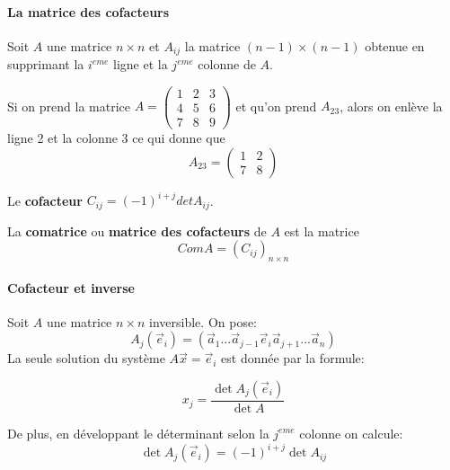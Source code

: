 




\paragraph{La matrice des cofacteurs} Soit $A$ une matrice $n \times n$ et $A_{ij}$ la matrice $(n-1) \times (n-1)$ obtenue en supprimant la $i^{eme}$ ligne et la $j^{eme}$ colonne de $A$.
\\
\begin{exemple}
    Si on prend la matrice $A = \begin{pmatrix}
        1 & 2 & 3 \\
        4 & 5 & 6 \\
        7 & 8 & 9
    \end{pmatrix}$ et qu'on prend $A_{23}$, alors on enlève la ligne 2 et la colonne 3 ce qui donne que 
    \[ A_{23} = \begin{pmatrix}
        1 & 2 \\
        7 & 8
    \end{pmatrix}\]
    \begin{definition}
        Le \textbf{cofacteur} $C_{ij} = (-1)^{i+j}det A_{ij}$.
    \end{definition}
\end{exemple}
\begin{definition}
    
    La \textbf{comatrice} ou \textbf{matrice des cofacteurs} de $A$ est la matrice
    \[ComA = (C_{ij})_{n\times n}\]
\end{definition}

\paragraph{Cofacteur et inverse}
Soit $A$ une matrice $n \times n$ inversible. On pose:
\[A_j(\vec{e}_i) = (\vec{a}_1 ... \vec{a}_{j-1} \vec{e}_i \vec{a}_{j+1} ... \vec{a}_n)\]
La seule solution du système $A\vec{x} = \vec{e}_i$ est donnée par la formule:
\begin{definition}
    \begin{equation*}
        x_j = \frac{\det A_j(\vec{e}_i)}{\det A}
    \end{equation*}
\end{definition}


De plus, en développant le déterminant selon la $j^{eme}$ colonne on calcule:
\[\det A_j(\vec{e}_i) = (-1)^{i+j}\det A_{ij}\]

